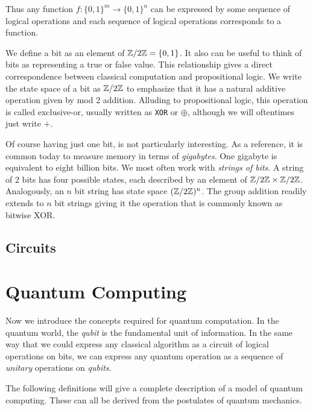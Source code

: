         Thus any function $f :  \{0, 1\}^m \rightarrow \{0, 1\}^n$ can be expressed by some sequence of logical 
        operations and each sequence of logical operations corresponds to a function. 

        
    
        
        We define a bit as an element of $\mathbb{Z}/2\mathbb{Z} = \{0,1\}$. It also can be useful to think of bits as representing 
        a true or false value. This relationship gives a direct correspondence between classical computation and 
        propositional logic. We write the state space of a bit as $\mathbb{Z}/2\mathbb{Z}$ to emphasize that it has a natural 
        additive operation given by mod 2 addition.  Alluding to propositional logic, this operation is called 
        exclusive-or, usually written as \texttt{XOR} or $\oplus$, although we will oftentimes just write $+$.

        Of course having just one bit, is not particularly interesting. As a reference, it is common today to 
        measure memory in terms of \emph{gigabytes}. One gigabyte is equivalent to eight billion bits. We most 
        often work with \emph{strings of bits}. A string of 2 bits has four possible states, each described by an 
        element of $\mathbb{Z}/2\mathbb{Z} \times \mathbb{Z}/2\mathbb{Z}$. Analogously, an $n$ bit string has state space $(\mathbb{Z}/2\mathbb{Z})^n$. The group 
        addition readily extends to $n$ bit strings giving it the operation that is commonly known as bitwise XOR.

        
        

        
        \subsection{Circuits}


\section{Quantum Computing}
        Now we introduce the concepts required for quantum computation. In the quantum world, the \emph{qubit} is 
        the fundamental unit of information. In the same way that we could express any classical algorithm as a 
        circuit of logical operations on bits, we can express any quantum operation as a sequence of \emph{unitary} 
        operations on \emph{qubits}.
        
        The following definitions will give a complete description of a model of quantum computing. These can all 
        be derived from the postulates of quantum mechanics.

